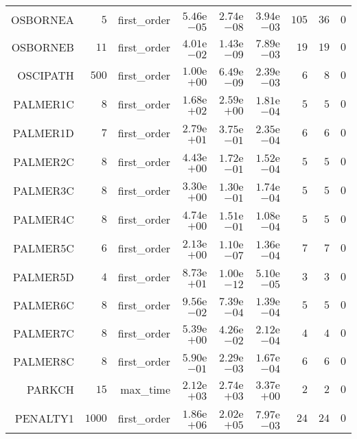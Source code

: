 \begin{longtable}{rrrrrrrrr}
OSBORNEA & \(     5\) & first\_order & \( 5.46\)e\(-05\) & \( 2.74\)e\(-08\) & \( 3.94\)e\(-03\) & \(   105\) & \(    36\) & \(     0\) \\
OSBORNEB & \(    11\) & first\_order & \( 4.01\)e\(-02\) & \( 1.43\)e\(-09\) & \( 7.89\)e\(-03\) & \(    19\) & \(    19\) & \(     0\) \\
OSCIPATH & \(   500\) & first\_order & \( 1.00\)e\(+00\) & \( 6.49\)e\(-09\) & \( 2.39\)e\(-03\) & \(     6\) & \(     8\) & \(     0\) \\
PALMER1C & \(     8\) & first\_order & \( 1.68\)e\(+02\) & \( 2.59\)e\(+00\) & \( 1.81\)e\(-04\) & \(     5\) & \(     5\) & \(     0\) \\
PALMER1D & \(     7\) & first\_order & \( 2.79\)e\(+01\) & \( 3.75\)e\(-01\) & \( 2.35\)e\(-04\) & \(     6\) & \(     6\) & \(     0\) \\
PALMER2C & \(     8\) & first\_order & \( 4.43\)e\(+00\) & \( 1.72\)e\(-01\) & \( 1.52\)e\(-04\) & \(     5\) & \(     5\) & \(     0\) \\
PALMER3C & \(     8\) & first\_order & \( 3.30\)e\(+00\) & \( 1.30\)e\(-01\) & \( 1.74\)e\(-04\) & \(     5\) & \(     5\) & \(     0\) \\
PALMER4C & \(     8\) & first\_order & \( 4.74\)e\(+00\) & \( 1.51\)e\(-01\) & \( 1.08\)e\(-04\) & \(     5\) & \(     5\) & \(     0\) \\
PALMER5C & \(     6\) & first\_order & \( 2.13\)e\(+00\) & \( 1.10\)e\(-07\) & \( 1.36\)e\(-04\) & \(     7\) & \(     7\) & \(     0\) \\
PALMER5D & \(     4\) & first\_order & \( 8.73\)e\(+01\) & \( 1.00\)e\(-12\) & \( 5.10\)e\(-05\) & \(     3\) & \(     3\) & \(     0\) \\
PALMER6C & \(     8\) & first\_order & \( 9.56\)e\(-02\) & \( 7.39\)e\(-04\) & \( 1.39\)e\(-04\) & \(     5\) & \(     5\) & \(     0\) \\
PALMER7C & \(     8\) & first\_order & \( 5.39\)e\(+00\) & \( 4.26\)e\(-02\) & \( 2.12\)e\(-04\) & \(     4\) & \(     4\) & \(     0\) \\
PALMER8C & \(     8\) & first\_order & \( 5.90\)e\(-01\) & \( 2.29\)e\(-03\) & \( 1.67\)e\(-04\) & \(     6\) & \(     6\) & \(     0\) \\
PARKCH & \(    15\) & max\_time & \( 2.12\)e\(+03\) & \( 2.74\)e\(+03\) & \( 3.37\)e\(+00\) & \(     2\) & \(     2\) & \(     0\) \\
PENALTY1 & \(  1000\) & first\_order & \( 1.86\)e\(+06\) & \( 2.02\)e\(+05\) & \( 7.97\)e\(-03\) & \(    24\) & \(    24\) & \(     0\) \\

\end{longtable}
